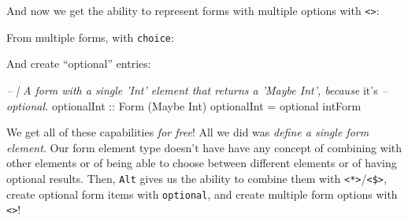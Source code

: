 \documentclass[]{article}
\newenvironment{Shaded}{}{}
\newcommand{\CommentTok}[1]{\textcolor[rgb]{0.38,0.63,0.69}{\textit{#1}}}
\newcommand{\DataTypeTok}[1]{\textcolor[rgb]{0.56,0.13,0.00}{#1}}
\newcommand{\FunctionTok}[1]{\textcolor[rgb]{0.02,0.16,0.49}{#1}}
\newcommand{\NormalTok}[1]{#1}
\newcommand{\OtherTok}[1]{\textcolor[rgb]{0.00,0.44,0.13}{#1}}
\begin{document}
And now we get the ability to represent forms with multiple options with
\texttt{\textless{}\textbar{}\textgreater{}}:

\begin{Shaded}
\end{Shaded}

From multiple forms, with \texttt{choice}:

\begin{Shaded}
\end{Shaded}

And create ``optional'' entries:

\begin{Shaded}
\begin{Highlighting}[]
\CommentTok{-- | A form with a single 'Int' element that returns a 'Maybe Int', because}
\NormalTok{it's }\CommentTok{-- optional.}
\OtherTok{optionalInt ::} \DataTypeTok{Form}\NormalTok{ (}\DataTypeTok{Maybe} \DataTypeTok{Int}\NormalTok{)}
\NormalTok{optionalInt }\FunctionTok{=}\NormalTok{ optional intForm}
\end{Highlighting}
\end{Shaded}

We get all of these capabilities \emph{for free}! All we did was \emph{define a
single form element}. Our form element type doesn't have have any concept of
combining with other elements or of being able to choose between different
elements or of having optional results. Then, \texttt{Alt} gives us the ability
to combine them with
\texttt{\textless{}*\textgreater{}}/\texttt{\textless{}\$\textgreater{}}, create
optional form items with \texttt{optional}, and create multiple form options
with \texttt{\textless{}\textbar{}\textgreater{}}!
\end{document}
